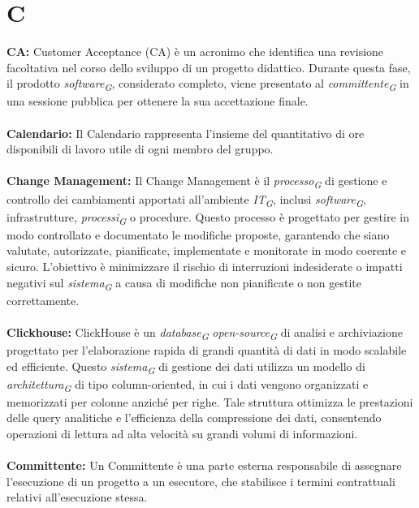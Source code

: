 \documentclass{article}
\begin{document}
\section*{C}
{}
\textbf{CA:} Customer Acceptance (CA) è un acronimo che identifica una revisione facoltativa nel corso dello sviluppo di un progetto didattico. Durante questa fase, il prodotto \textit{software}\textsubscript{\textit{G}}, considerato completo, viene presentato al \textit{committente}\textsubscript{\textit{G}} in una sessione pubblica per ottenere la sua accettazione finale.
\\
\\
\textbf{Calendario:} Il Calendario rappresenta l’insieme del quantitativo di ore disponibili di lavoro utile di ogni membro del gruppo.
\\
\\
\textbf{Change Management:} Il Change Management è il \textit{processo}\textsubscript{\textit{G}} di gestione e controllo dei cambiamenti apportati all'ambiente \textit{IT}\textsubscript{\textit{G}}, inclusi \textit{software}\textsubscript{\textit{G}}, infrastrutture, \textit{processi}\textsubscript{\textit{G}} o procedure. Questo processo è progettato per gestire in modo controllato e documentato le modifiche proposte, garantendo che siano valutate, autorizzate, pianificate, implementate e monitorate in modo coerente e sicuro. L'obiettivo è minimizzare il rischio di interruzioni indesiderate o impatti negativi sul \textit{sistema}\textsubscript{\textit{G}} a causa di modifiche non pianificate o non gestite correttamente.
\\
\\
\textbf{Clickhouse:} ClickHouse è un \textit{database}\textsubscript{\textit{G}} \textit{open-source}\textsubscript{\textit{G}} di analisi e archiviazione progettato per l'elaborazione rapida di grandi quantità di dati in modo scalabile ed efficiente. Questo \textit{sistema}\textsubscript{\textit{G}} di gestione dei dati utilizza un modello di \textit{architettura}\textsubscript{\textit{G}} di tipo column-oriented, in cui i dati vengono organizzati e memorizzati per colonne anziché per righe. Tale struttura ottimizza le prestazioni delle query analitiche e l'efficienza della compressione dei dati, consentendo operazioni di lettura ad alta velocità su grandi volumi di informazioni. 
\\
\\
\textbf{Committente:} Un Committente è una parte esterna responsabile di assegnare l'esecuzione di un progetto a un esecutore, che stabilisce i termini contrattuali relativi all'esecuzione stessa.
\end{document}

